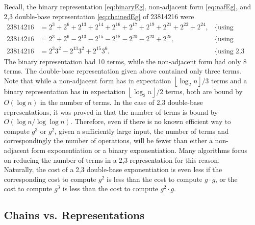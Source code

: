 \documentclass{ucalgthes1}
\theoremstyle{plain}
\theoremstyle{definition}
\newcommand{\floor}[1]{\left\lfloor #1 \right\rfloor}
\begin{document}
Recall, the binary representation \eqref{eq:binaryEg}, non-adjacent form \eqref{eq:nafEg}, and 2,3 double-base representation \eqref{eq:chainedEg} of 23814216 were
\begin{align*}
	23814216 &= 2^3+2^6+2^{13}+2^{14}+2^{16}+2^{17}+2^{19}+2^{21}+2^{22}+2^{24}, & \mbox{\{using binary\}} \\
	23814216 &= 2^3+2^6-2^{13}-2^{15}-2^{18}-2^{20}-2^{23}+2^{25}, & \mbox{\{using NAF\}} \\
	23814216 &= 2^3 3^2 -2^{13} 3^2 +2^{15} 3^6. & \mbox{\{using 2,3 DBNS\}}
\end{align*}
The binary representation had 10 terms, while the non-adjacent form had only 8 terms.  The double-base representation given above contained only three terms.  Note that while a non-adjacent form has in expectation $\floor{\log_2 n}/3$ terms and a binary representation has in expectation $\floor{\log_2 n}/2$ terms, both are bound by $O(\log n)$ in the number of terms.  In the case of 2,3 double-base representations, it was proved in \cite{Ciet2005} that the number of terms is bound by $O(\log n / \log \log n)$.  Therefore, even if there is no known efficient way to compute $g^3$ or $g^2$, given a sufficiently large input, the number of terms and correspondingly the number of operations, will be fewer than either a non-adjacent form exponentiation or a binary exponentiation.  Many algorithms focus on reducing the number of terms in a 2,3 representation for this reason.   Naturally, the cost of a 2,3 double-base exponentiation is even less if the corresponding cost to compute $g^2$ is less than the cost to compute $g \cdot g$, or the cost to compute $g^3$ is less than the cost to compute $g^2 \cdot g$. 


\bigbreak
\subsection{Chains vs. Representations}
\end{document}
